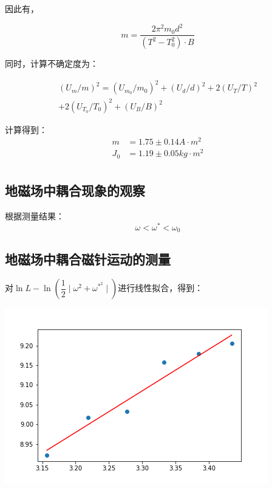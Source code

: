\documentclass[a4paper]{ltxdoc}
\newenvironment{Figure}
{\par\medskip\noindent\minipage{\linewidth}}
{\endminipage\par\medskip}
\begin{document}
\begin{multicols}{2}
    因此有，

    \begin{equation}
        m = \dfrac{2\pi^2m_0d^2}{(T^2 - T_0^2)\cdot B}
    \end{equation}

    同时，计算不确定度为：

    \begin{equation}
        \begin{aligned}
            (U_m / m)^2 = (U_{m_0}/m_0)^2 + (U_d/d)^2 + 2(U_T/T)^2 \\
            + 2(U_{T_0}/{T_0})^2 + (U_B/B)^2
        \end{aligned}
    \end{equation}

    计算得到：
    \begin{equation}
        \begin{aligned}
            m   & = 1.75 \pm 0.14 A\cdot m^2  \\
            J_0 & = 1.19 \pm 0.05 kg\cdot m^2 \\
        \end{aligned}
    \end{equation}
    \subsection{地磁场中耦合现象的观察}

    根据测量结果：
    \begin{equation}
        \omega < \omega^{*} < \omega_0
    \end{equation}

    \subsection{地磁场中耦合磁针运动的测量}

    对$\ln L - \ln (\dfrac 1 2 \mid \omega^2 + \omega^{*^{2}} \mid)$进行线性拟合，得到：

    \begin{Figure}
        \centering
        \includegraphics[scale=0.5]{img/data_3.png}
    \end{Figure}


\end{multicols}
\end{document}
